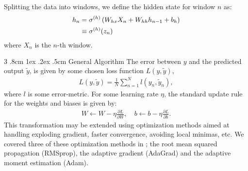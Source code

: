 \documentclass[%
reprint,
amsmath,amssymb,
aps,
]{revtex4-2}
\makeatletter
\renewcommand{\subsubsection}{%
	\@startsection
	{subsubsection}%
	{3}%
	{\z@}%
	{.8cm \@plus1ex \@minus .2ex}%
	{.5cm}%
	{\normalfont\small\centering}%
}
\makeatother
\begin{document}
Splitting the data into windows, we define the hidden state for window \(n\) as:
\begin{align}
	h_{n} &= \sigma^{(h)}\left( W_{hx}X_{n} + W_{hh}h_{n-1} + b_{h} \right) \notag \\
	&\equiv \sigma^{(h)}(z_{n})
\end{align}
where \(X_{n}\) is the \(n\)-th window.

\subsubsection{General Algorithm}
The error between \(y\) and the predicted output \(\tilde{y}\), is given by some chosen loss function \(L(y, \tilde{y})\),
\begin{align}	
	L(y,\tilde{y}) = \frac{1}{N}\sum\limits_{n=1}^{N} l(y_{n}, \tilde{y}_n),
\end{align}
where \(l\) is some error-metric. 
For some learning rate \(\eta\), the standard update rule for the weights and biases is given by:
\begin{align}	\label{eq:learning_rate}
	W\leftarrow W-\eta \frac{\partial L}{\partial W},\quad b\leftarrow b-\eta \frac{\partial L}{\partial b}.
\end{align}
This transformation may be extended using optimization methods aimed at handling exploding gradient, faster convergence, avoiding local minimas, etc. We covered three of these optimization methods in \cite{project2}; the root mean squared propagation (RMSprop), the adaptive gradient (AdaGrad) and the adaptive moment estimation (Adam). 
\end{document}

